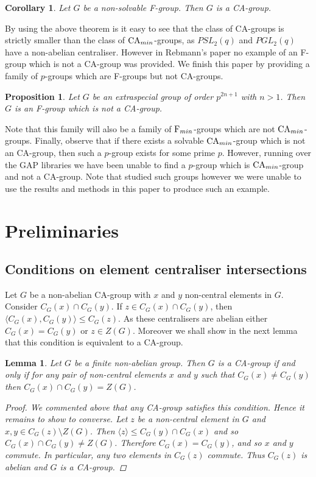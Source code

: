 \documentclass[a4paper,11pt]{article}
\theoremstyle{plain}
\newtheorem{cor}[thm]{Corollary}
\newtheorem{prop}[thm]{Proposition}
\newtheorem{lm}[thm]{Lemma}
\numberwithin{thm}{section}
\begin{document}
\begin{cor}\label{NonSolFIsCA}
Let $G$ be a non-solvable F-group.
Then $G$ is a CA-group.
\end{cor}


By using the above theorem is it easy to see that the class of CA-groups is  strictly smaller than the class of ${\rm CA}_{min}$-groups, as $PSL_2(q)$ and $PGL_2(q)$ have a non-abelian centraliser.
However in Rebmann's paper no example of an F-group which is not a CA-group was provided.
We finish this paper by providing a family of $p$-groups which are F-groups but not CA-groups.

\begin{prop}\label{FNotCA}
Let $G$ be an extraspecial group of order $p^{2n+1}$ with $n>1$.
Then $G$ is an F-group which is not a CA-group.
\end{prop}

Note that this family will also be a family of ${\rm F}_{min}$-groups which are not ${\rm CA}_{min}$-groups.
Finally, observe that if there exists a solvable ${\rm CA}_{min}$-group which is not an CA-group, then such a $p$-group exists for some prime $p$. 
However, running over the GAP libraries we have been unable to find a $p$-group which is ${\rm CA}_{min}$-group and not a CA-group.
Note that \cite{RockeAbCent} studied such groups however we were unable to use the results and methods in this paper to produce such an example.




\section{Preliminaries}
\subsection{Conditions on element centraliser intersections}

Let $G$ be a non-abelian CA-group with $x$ and $y$ non-central elements in $G$.
Consider $C_G(x)\cap C_G(y)$.
If $z\in C_G(x)\cap C_G(y)$, then $\langle C_G(x),C_G(y)\rangle\leq C_G(z)$.
As these centralisers are abelian either $C_G(x)= C_G(y)$ or $z\in Z(G)$.
Moreover we shall show in the next lemma that this condition is equivalent to a CA-group. 

\begin{lm}\label{TIC=CA}
Let $G$ be a finite non-abelian group.
Then $G$ is a CA-group if and only if for any pair of non-central elements $x$ and $y$ such that $C_G(x)\ne C_G(y)$ then $C_G(x)\cap C_G(y)=Z(G)$.
\begin{proof}
We commented above that any CA-group satisfies this condition. 
Hence it remains to show to converse.
Let $z$ be a non-central element in $G$ and $x,y\in C_G(z)\setminus Z(G)$.
Then $\langle z\rangle \leq C_G(y)\cap C_G(x)$ and so $C_G(x)\cap C_G(y)\ne Z(G)$.
Therefore $C_G(x)= C_G(y)$, and so $x$ and $y$ commute.
In particular, any two elements in $C_G(z)$ commute.
Thus $C_G(z)$ is abelian and $G$ is a CA-group.
\end{proof}
\end{lm}
\end{document}
